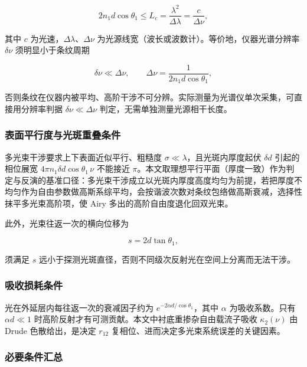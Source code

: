 \documentclass[withoutpreface,bwprint]{cumcmthesis}
\begin{document}
\begin{equation}
2n_1 d\cos\theta_1 \le L_c = \frac{\lambda^{2}}{\Delta\lambda} = \frac{c}{\Delta\nu},
\label{eq:coherence}
\end{equation}

其中 $c$ 为光速，$\Delta\lambda$、$\Delta\nu$ 为光源线宽（波长或波数计）。等价地，仪器光谱分辨率 $\delta\nu$ 须明显小于条纹周期

\begin{equation}
\delta\nu \ll \Delta\nu,
\qquad
\Delta\nu = \frac{1}{2n_1 d\cos\theta_1},
\label{eq:resolution}
\end{equation}

否则条纹在仪器内被平均、高阶干涉不可分辨。实际测量为光谱仪单次采集，可直接用分辨率判据 $\delta\nu\ll\Delta\nu$ 判定，无需单独测量光源相干长度。

\subsubsection{表面平行度与光斑重叠条件}

多光束干涉要求上下表面近似平行、粗糙度 $\sigma\ll\lambda$，且光斑内厚度起伏 $\delta d$ 引起的相位展宽 $4\pi n_1\delta d\cos\theta_1\,\nu$ 不能接近 $\pi$。本文取理想平行平面（厚度一致）作为判定与反演的基准口径：多光束干涉成立以光斑内厚度高度均匀为前提，若把厚度不均匀作为自由参数做高斯系综平均，会按谐波次数对条纹包络做高斯衰减，选择性抹平多光束高阶项，使 Airy 多出的高阶自由度退化回双光束。

此外，光束往返一次的横向位移为

\begin{equation}
s = 2d\tan\theta_1,
\label{eq:lateral}
\end{equation}

须满足 $s$ 远小于探测光斑直径，否则不同级次反射光在空间上分离而无法干涉。

\subsubsection{吸收损耗条件}

光在外延层内每往返一次的衰减因子约为 $e^{-2\alpha d/\cos\theta_1}$，其中 $\alpha$ 为吸收系数。只有 $\alpha d\ll 1$ 时高阶反射才有可测贡献。本文中衬底重掺杂自由载流子吸收 $\kappa_2(\nu)$ 由 Drude 色散给出，是决定 $r_{12}$ 复相位、进而决定多光束系统误差的关键因素。

\subsubsection{必要条件汇总}
\end{document}
